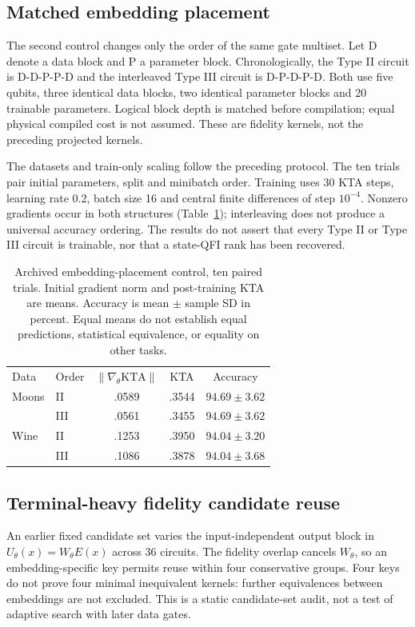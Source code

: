 \subsection{Matched embedding placement}
The second control changes only the order of the same gate multiset.
Let D denote a data block and P a parameter block. Chronologically,
the Type II circuit is D-D-P-P-D and the interleaved Type III circuit
is D-P-D-P-D. Both use five qubits, three identical data blocks,
two identical parameter blocks and 20 trainable parameters. Logical
block depth is matched before compilation; equal physical compiled
cost is not assumed. These are fidelity kernels, not the preceding
projected kernels.

The datasets and train-only scaling follow the preceding protocol.
The ten trials pair initial parameters, split and minibatch order.
Training uses 30 KTA steps, learning rate 0.2, batch size 16 and
central finite differences of step $10^{-4}$. Nonzero gradients occur
in both structures (Table~\ref{tab:legacy_order}); interleaving does
not produce a universal accuracy ordering. The results do not assert
that every Type II or Type III circuit is trainable, nor that a
state-QFI rank has been recovered.

\begin{table}[tb]
\caption{Archived embedding-placement control, ten paired trials.
Initial gradient norm and post-training KTA are means. Accuracy is
mean $\pm$ sample SD in percent. Equal means do not establish equal
predictions, statistical equivalence, or equality on other tasks.}
\label{tab:legacy_order}
\begin{tabular}{llccc}
\toprule
Data & Order & $\|\nabla_\theta\mathrm{KTA}\|$ & KTA & Accuracy\\
Moons & II  & .0589 & .3544 & $94.69\pm3.62$\\
      & III & .0561 & .3455 & $94.69\pm3.62$\\
Wine  & II  & .1253 & .3950 & $94.04\pm3.20$\\
      & III & .1086 & .3878 & $94.04\pm3.68$\\
\bottomrule
\end{tabular}
\end{table}

\subsection{Terminal-heavy fidelity candidate reuse}
An earlier fixed candidate set varies the input-independent output
block in $U_\theta(x)=W_\theta E(x)$ across 36 circuits. The fidelity
overlap cancels $W_\theta$, so an embedding-specific key permits reuse
within four conservative groups. Four keys do not prove four minimal
inequivalent kernels: further equivalences between embeddings are
not excluded. This is a static candidate-set audit, not a test of
adaptive search with later data gates.

